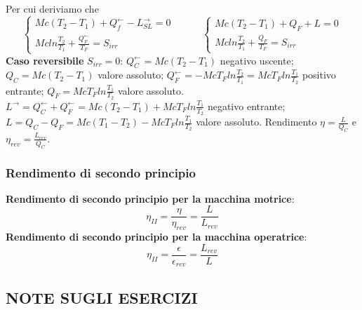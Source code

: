 Per cui deriviamo che
\[
    \begin{cases}
        Mc(T_2-T_1) + Q_f^\leftarrow - L_{SL}^\rightarrow  = 0\\
        Mc ln \frac{T_2}{T_1} + \frac{Q_F^\leftarrow}{T_F} = S_{irr}
    \end{cases} \;\;\;\;\;\;\;\;\;\; \begin{cases}
        Mc(T_2-T_1) + Q_F + L = 0\\ Mc ln \frac{T_2}{T_1} + \frac{Q_F}{T_F} = S_{irr}
    \end{cases}
\]
\textbf{Caso reversibile} $S_{irr} = 0$:
$Q_C^\leftarrow =  Mc(T_2-T_1)$ negativo uscente; \newline
$Q_C =  Mc(T_2-T_1)$ valore assoluto; \newline
\newline
$Q_F^\leftarrow  = - Mc T_F ln \frac{T_2}{T_1} = Mc T_F ln \frac{T_1}{T_2}$ positivo entrante;\newline
$Q_F = Mc T_F ln \frac{T_1}{T_2}$ valore assoluto.\newline
\newline
$L^\rightarrow  = Q_C^\leftarrow  + Q_F^\leftarrow  = Mc(T_2 -T_1) + Mc T_F ln \frac{T_1}{T_2}$ negativo entrante;\newline
$L = Q_C- Q_F = Mc (T_1-T_2) - McT_F ln \frac{T_1}{T_2}$ valore assoluto.\newline
\newline
Rendimento $\eta = \frac{L}{Q_C}$ e $\eta_{rev} = \frac{L_{rev}}{Q_C}$.
\subsubsection{Rendimento di secondo principio}
\textbf{Rendimento di secondo principio per la macchina motrice}:
\[
    \eta_{II} = \frac{\eta}{\eta_{rev}} = \frac{L}{L_{rev}}
\]
\textbf{Rendimento di secondo principio per la macchina operatrice}:
\[
    \eta_{II} = \frac{\epsilon}{\epsilon_{rev}} = \frac{L_{rev}}{L}
\]
\subsection{NOTE SUGLI ESERCIZI}